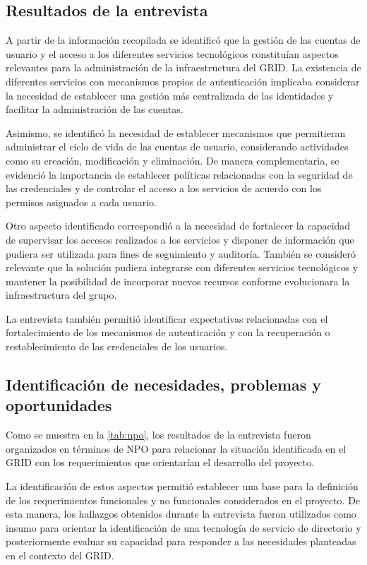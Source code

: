 \subsection{Resultados de la entrevista}

A partir de la información recopilada se identificó que la gestión de las cuentas de usuario y el acceso a los diferentes servicios tecnológicos constituían aspectos relevantes para la administración de la infraestructura del \ac{GRID}. La existencia de diferentes servicios con mecanismos propios de autenticación implicaba considerar la necesidad de establecer una gestión más centralizada de las identidades y facilitar la administración de las cuentas.

Asimismo, se identificó la necesidad de establecer mecanismos que permitieran administrar el ciclo de vida de las cuentas de usuario, considerando actividades como su creación, modificación y eliminación. De manera complementaria, se evidenció la importancia de establecer políticas relacionadas con la seguridad de las credenciales y de controlar el acceso a los servicios de acuerdo con los permisos asignados a cada usuario.

Otro aspecto identificado correspondió a la necesidad de fortalecer la capacidad de supervisar los accesos realizados a los servicios y disponer de información que pudiera ser utilizada para fines de seguimiento y auditoría. También se consideró relevante que la solución pudiera integrarse con diferentes servicios tecnológicos y mantener la posibilidad de incorporar nuevos recursos conforme evolucionara la infraestructura del grupo.

La entrevista también permitió identificar expectativas relacionadas con el fortalecimiento de los mecanismos de autenticación y con la recuperación o restablecimiento de las credenciales de los usuarios.

\subsection{Identificación de necesidades, problemas y oportunidades}\label{subsec:identificacion-necesidades}

Como se muestra en la \autoref{tab:npo}, los resultados de la entrevista fueron organizados en términos de \ac{NPO} para relacionar la situación identificada en el \ac{GRID} con los requerimientos que orientarían el desarrollo del proyecto.



La identificación de estos aspectos permitió establecer una base para la definición de los requerimientos funcionales y no funcionales considerados en el proyecto. De esta manera, los hallazgos obtenidos durante la entrevista fueron utilizados como insumo para orientar la identificación de una tecnología de servicio de directorio y posteriormente evaluar su capacidad para responder a las necesidades planteadas en el contexto del \ac{GRID}.
